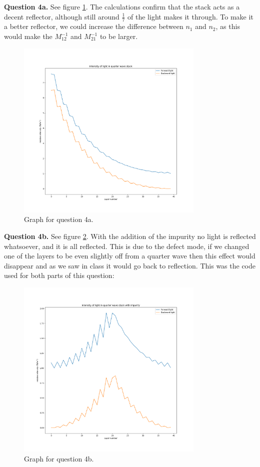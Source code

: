 \documentclass[letterpaper, reqno,11pt]{article}
\begin{document}
{\medskip\noindent\bf Question 4a.} See figure \ref{fig:q4a}. The calculations confirm that the stack acts as a decent reflector, although still around $\frac{1}{7}$ of the light makes it through. To make it a better reflector, we could increase the difference between $n_1$ and $n_2$, as this would make the $M_{12}^{-1}$ and $M_{21}^{-1}$ to be larger.\begin{figure}[htpb]
    \centering
    \includegraphics[width=0.8\textwidth]{q4a}
    \caption{Graph for question 4a.}
    \label{fig:q4a}
\end{figure}

{\medskip\noindent\bf Question 4b.} See figure \ref{fig:q4b}. With the addition of the impurity no light is reflected whatsoever, and it is all reflected. This is due to the defect mode, if we changed one of the layers to be even slightly off from a quarter wave then this effect would disappear and as we saw in class it would go back to reflection. This was the code used for both parts of this question:

\begin{figure}[htpb]
    \centering
    \includegraphics[width=0.8\textwidth]{q4b}
    \caption{Graph for question 4b.}
    \label{fig:q4b}
\end{figure}
\end{document}
